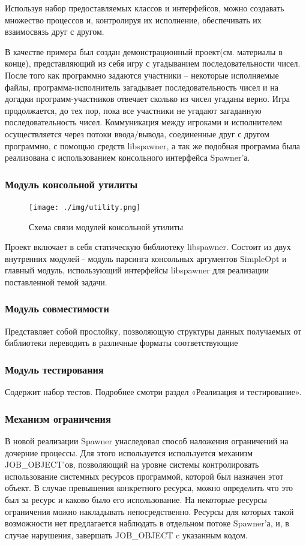 \documentclass{imcs}
\begin{document}
Используя набор предоставляемых классов и интерфейсов, можно создавать множество процессов и, контролируя их исполнение, обеспечивать их взаимосвязь друг с другом.

В качестве примера был создан демонстрационный проект(см. материалы в конце), представляющий из себя игру с угадыванием последовательности чисел. После того как программно задаются участники – некоторые исполняемые файлы, программа-исполнитель загадывает последовательность чисел и на догадки программ-участников отвечает сколько из чисел угаданы верно. Игра продолжается, до тех пор, пока все участники не угадают загаданную последовательность чисел. Коммуникация между игроками и исполнителем осуществляется через потоки ввода/вывода, соединенные друг с другом программно, с помощью средств libspawner, а так же подобная программа была реализована с использованием консольного интерфейса Spawner'а.
\FloatBarrier

\subsubsection{Модуль консольной утилиты}
\FloatBarrier 
\begin{figure}[htb]
\centering
\texttt{[image: ./img/utility.png]}
\caption{Схема связи модулей консольной утилиты}
\label{utility}
\end{figure}

Проект включает в себя статическую библиотеку libspawner.
Состоит из двух внутренних модулей - модуль парсинга консольных аргументов SimpleOpt и главный модуль, использующий интерфейсы libspawner для реализации поставленной темой задачи.
\FloatBarrier
\subsubsection{Модуль совместимости}
Представляет собой прослойку, позволяющую структуры данных получаемых от библиотеки переводить в различные форматы соответствующие 
\subsubsection{Модуль тестирования}
Содержит набор тестов. Подробнее смотри раздел «Реализация и тестирование».
\subsubsection{Механизм ограничения}
В новой реализации Spawner унаследовал способ наложения ограничений на дочерние процессы. Для этого используется используется механизм JOB\_OBJECT'ов\cite{job_object}, позволяющий на уровне системы контролировать использование системных ресурсов программой, которой был назначен этот объект. В случае превышения конкретного ресурса, можно определить что это был за ресурс и каково было его использование. На некоторые ресурсы ограничения можно накладывать непосредственно. Ресурсы для которых такой возможности нет предлагается наблюдать в отдельном потоке Spawner'а, и, в случае нарушения, завершать JOB\_OBJECT c указанным кодом.
\end{document}
